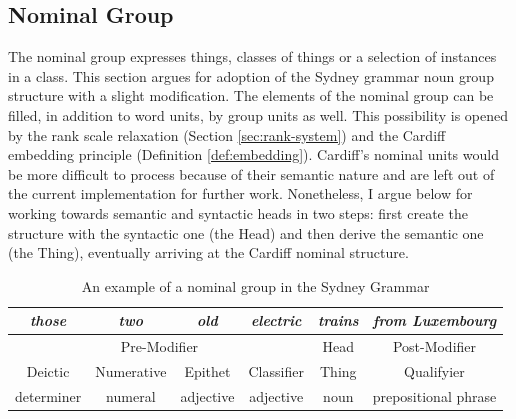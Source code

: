     


\subsection{Nominal Group}
\label{sec:nominal-group}
    
    The nominal group expresses things, classes of things or a selection of instances in a class. This section argues for adoption of the Sydney grammar noun group structure with a slight modification. The elements of the nominal group can be filled, in addition to word units, by group units as well. This possibility is opened by the rank scale relaxation (Section \ref{sec:rank-system}) and the Cardiff embedding principle (Definition \ref{def:embedding}). Cardiff's nominal units would be more difficult to process because of their semantic nature and are left out of the current implementation for further work. Nonetheless, I argue below for working towards semantic and syntactic heads in two steps: first create the structure with the syntactic one (the Head) and then derive the semantic one (the Thing), eventually arriving at the Cardiff nominal structure.
    
    \begin{table}[!ht]
        \centering
    	\begin{tabular}{|c|c|c|c|c|c|}
    		\hline
    		\textit{those} & \textit{two} & \textit{old} & \textit{electric} & \textit{trains} & \textit{from Luxembourg} \\ \hline
    		\multicolumn{4}{|c|}{Pre-Modifier}                               & Head            & Post-Modifier            \\ \hline
    		Deictic        & Numerative   & Epithet      & Classifier        & Thing           & Qualifyier               \\ \hline
    		determiner     & numeral      & adjective    & adjective         & noun            & prepositional phrase     \\ \hline
    	\end{tabular}
    	\caption{An example of a nominal group in the Sydney Grammar \citep[264]{Halliday2013}}
    	\label{tab:example-ng}
    \end{table}
    
